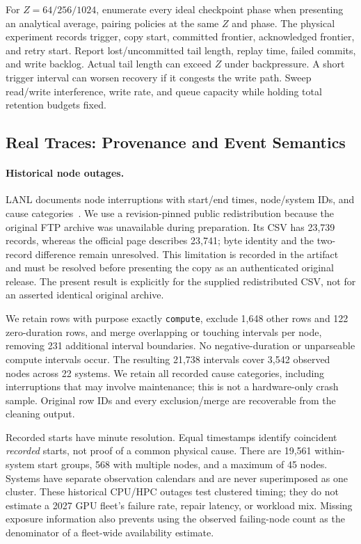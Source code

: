 \documentclass[sigplan,10pt,anonymous,nonacm]{acmart}
\begin{document}
For $Z=64/256/1024$, enumerate every ideal checkpoint phase when presenting
an analytical average, pairing policies at the same $Z$ and phase.
The physical experiment records trigger, copy start, committed frontier,
acknowledged frontier, and retry start. Report lost/uncommitted tail
length, replay time, failed commits, and write backlog. Actual tail length
can exceed $Z$ under backpressure. A short trigger interval can worsen
recovery if it congests the write path. Sweep read/write interference,
write rate, and queue capacity while holding total retention budgets fixed.

\FloatBarrier
\subsection{Real Traces: Provenance and Event Semantics}

\paragraph{Historical node outages.}
LANL documents node interruptions with start/end times, node/system IDs,
and cause categories~\cite{lanlFailureData,schroeder2006failures}. We use
a revision-pinned public redistribution because the original FTP archive
was unavailable during preparation. Its CSV has 23,739 records, whereas
the official page describes 23,741; byte identity and the two-record
difference remain unresolved. This limitation is recorded in the artifact
and must be resolved before presenting the copy as an authenticated
original release. The present result is explicitly for the supplied
redistributed CSV, not for an asserted identical original archive.

We retain rows with purpose exactly \texttt{compute}, exclude 1,648 other
rows and 122 zero-duration rows, and merge overlapping or touching
intervals per node, removing 231 additional interval boundaries. No
negative-duration or unparseable compute intervals occur. The resulting
21,738 intervals cover 3,542 observed nodes across 22 systems. We retain
all recorded cause categories, including interruptions that may involve
maintenance; this is not a hardware-only crash sample. Original row IDs
and every exclusion/merge are recoverable from the cleaning output.

Recorded starts have minute resolution. Equal timestamps identify
coincident \emph{recorded} starts, not proof of a common physical cause.
There are 19,561 within-system start groups, 568 with multiple nodes,
and a maximum of 45 nodes. Systems have separate observation calendars
and are never superimposed as one cluster. These historical CPU/HPC
outages test clustered timing; they do not estimate a 2027 GPU fleet's
failure rate, repair latency, or workload mix. Missing exposure information
also prevents using the observed failing-node count as the denominator
of a fleet-wide availability estimate.
\end{document}
